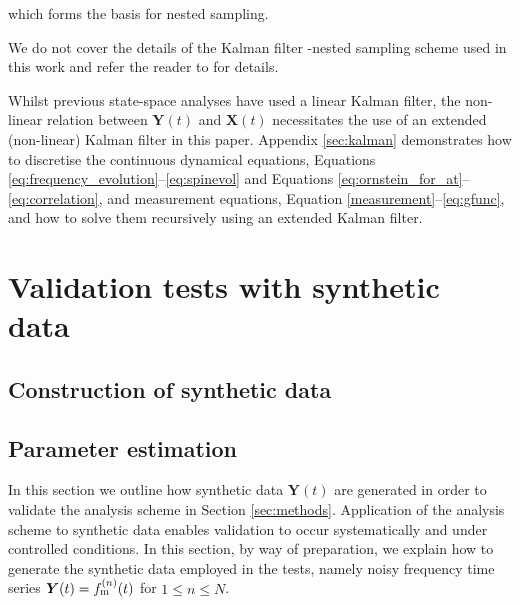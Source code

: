 \documentclass[fleqn,usenatbib,useAMS]{mnras}
\begin{document}
which forms the basis for nested sampling. 


We do not cover the details of the Kalman filter -nested sampling scheme used in this work and refer the reader to \citep[e.g.][]{KimpsonPTA1,KimpsonPTA2} for details.



Whilst previous state-space analyses have used a linear Kalman filter, the non-linear relation between ${\boldsymbol{Y}}(t)$ and ${\boldsymbol{X}}(t)$ necessitates the use of an extended (non-linear) Kalman filter \citep{zarchan2000fundamentals} in this paper. Appendix \ref{sec:kalman} demonstrates how to discretise the continuous dynamical equations, Equations \eqref{eq:frequency_evolution}--\eqref{eq:spinevol} and Equations \eqref{eq:ornstein_for_at}--\eqref{eq:correlation}, and measurement equations, Equation \eqref{measurement}--\eqref{eq:gfunc}, and how to solve them recursively using an extended Kalman filter. 





\section{Validation tests with synthetic data}\label{sec:validation}





\subsection{Construction of synthetic data}





\subsection{Parameter estimation}



In this section we outline how synthetic data ${\boldsymbol{Y}}(t)$ are generated in order to validate the analysis scheme in Section \ref{sec:methods}. Application of the analysis scheme to synthetic data enables validation to occur systematically and under controlled conditions. In this section, by way of preparation, we explain how to generate the synthetic data employed in the tests, namely noisy frequency time series ${\boldsymbol{Y}}(t) =f_{\rm m}^{(n)}(t)$ for $1 \leq n \leq N$. 


\end{document}
